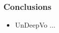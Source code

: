 \begin{frame}
    \frametitle{Conclusions}
    \begin{itemize}
        \item UnDeepVo ...
    \end{itemize}
\end{frame}
